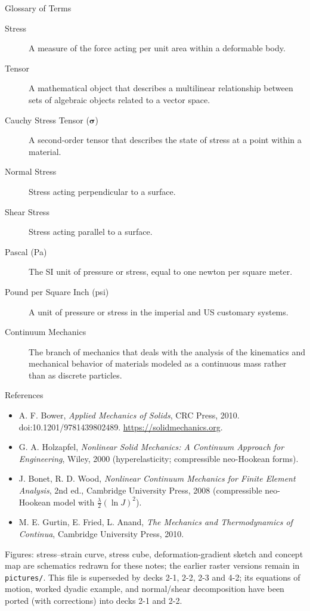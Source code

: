 \documentclass{beamer}
\begin{document}
\begin{frame}{Glossary of Terms}
  \begin{description}
    \item[Stress] A measure of the force acting per unit area within a deformable body.
    \item[Tensor] A mathematical object that describes a multilinear relationship between sets of algebraic objects related to a vector space.
    \item[Cauchy Stress Tensor ($\boldsymbol{\sigma}$)] A second-order tensor that describes the state of stress at a point within a material.
    \item[Normal Stress] Stress acting perpendicular to a surface.
    \item[Shear Stress] Stress acting parallel to a surface.
    \item[Pascal (Pa)] The SI unit of pressure or stress, equal to one newton per square meter.
    \item[Pound per Square Inch (psi)] A unit of pressure or stress in the imperial and US customary systems.
    \item[Continuum Mechanics] The branch of mechanics that deals with the analysis of the kinematics and mechanical behavior of materials modeled as a continuous mass rather than as discrete particles.
  \end{description}
\end{frame}

\begin{frame}{References}
  \scriptsize
  \begin{itemize}
    \item A. F. Bower, \emph{Applied Mechanics of Solids}, CRC Press, 2010. doi:10.1201/9781439802489. \url{https://solidmechanics.org}.
    \item G. A. Holzapfel, \emph{Nonlinear Solid Mechanics: A Continuum Approach for Engineering}, Wiley, 2000 (hyperelasticity; compressible neo-Hookean forms).
    \item J. Bonet, R. D. Wood, \emph{Nonlinear Continuum Mechanics for Finite Element Analysis}, 2nd ed., Cambridge University Press, 2008 (compressible neo-Hookean model with $\frac{\lambda}{2}(\ln J)^2$).
    \item M. E. Gurtin, E. Fried, L. Anand, \emph{The Mechanics and Thermodynamics of Continua}, Cambridge University Press, 2010.
  \end{itemize}
  \medskip
  Figures: stress--strain curve, stress cube, deformation-gradient sketch and concept map are schematics redrawn for these notes; the earlier raster versions remain in \texttt{pictures/}. This file is superseded by decks 2-1, 2-2, 2-3 and 4-2; its equations of motion, worked dyadic example, and normal/shear decomposition have been ported (with corrections) into decks 2-1 and 2-2.
\end{frame}
\end{document}

